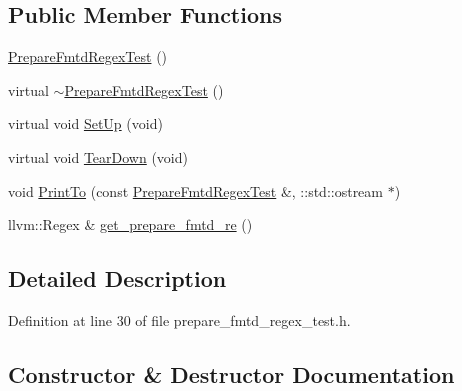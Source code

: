 \subsection*{Public Member Functions}
\begin{DoxyCompactItemize}
\item 
\hyperlink{classclang_1_1tidy_1_1pagesjaunes_1_1test_1_1_prepare_fmtd_regex_test_a0aea9a1f5ba9065ccdd3a09680fd8729}{Prepare\+Fmtd\+Regex\+Test} ()
\item 
virtual \hyperlink{classclang_1_1tidy_1_1pagesjaunes_1_1test_1_1_prepare_fmtd_regex_test_a84d5f0900af8ba308b895e5f238c48f8}{$\sim$\+Prepare\+Fmtd\+Regex\+Test} ()
\item 
virtual void \hyperlink{classclang_1_1tidy_1_1pagesjaunes_1_1test_1_1_prepare_fmtd_regex_test_abe1dd9af56b065c48db4ca30ef07e087}{Set\+Up} (void)
\item 
virtual void \hyperlink{classclang_1_1tidy_1_1pagesjaunes_1_1test_1_1_prepare_fmtd_regex_test_a78d879351536fdfdcbbf42cf3f9b6094}{Tear\+Down} (void)
\item 
void \hyperlink{classclang_1_1tidy_1_1pagesjaunes_1_1test_1_1_prepare_fmtd_regex_test_a6c5f05c2a94ac050fe0ba8d1390cae63}{Print\+To} (const \hyperlink{classclang_1_1tidy_1_1pagesjaunes_1_1test_1_1_prepare_fmtd_regex_test}{Prepare\+Fmtd\+Regex\+Test} \&, \+::std\+::ostream $\ast$)
\item 
llvm\+::\+Regex \& \hyperlink{classclang_1_1tidy_1_1pagesjaunes_1_1test_1_1_prepare_fmtd_regex_test_aca9612af31453209644fdc7f9a564aee}{get\+\_\+prepare\+\_\+fmtd\+\_\+re} ()
\end{DoxyCompactItemize}


\subsection{Detailed Description}


Definition at line 30 of file prepare\+\_\+fmtd\+\_\+regex\+\_\+test.\+h.



\subsection{Constructor \& Destructor Documentation}
\mbox{\label{classclang_1_1tidy_1_1pagesjaunes_1_1test_1_1_prepare_fmtd_regex_test_a0aea9a1f5ba9065ccdd3a09680fd8729}} 
